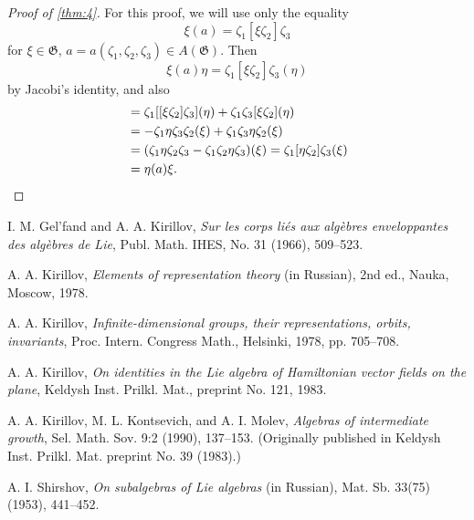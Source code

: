 \documentclass[a4paper]{article}
\begin{document}
\begin{proof}[Proof of \cref{thm:4}]
	For this proof, we will use only the equality
	\begin{equation*}
		\xi(a) = \zeta_1 [\xi \zeta_2] \zeta_3
	\end{equation*}
	for $\xi \in \mathfrak{G}$, $a = a(\zeta_1,\zeta_2,\zeta_3) \in A(\mathfrak{G})$.
	Then
	\begin{equation*}
		\xi(a) \eta = \zeta_1 [\xi \zeta_2] \zeta_3(\eta)
	\end{equation*}
	by Jacobi's identity, and also
	\begin{equation*}
		\begin{split}
			& = \zeta_1 [[\xi \zeta_2] \zeta_3](\eta) + \zeta_1 \zeta_3 [\xi \zeta_2](\eta) \\
			& = - \zeta_1 \eta \zeta_3 \zeta_2 (\xi) + \zeta_1 \zeta_3 \eta \zeta_2 (\xi) \\
			& = (\zeta_1 \eta \zeta_2 \zeta_3 - \zeta_1 \zeta_2 \eta \zeta_3) (\xi)
			= \zeta_1 [\eta \zeta_2] \zeta_3 (\xi) 
			\\
			& = \eta(a) \xi. \qedhere
		\end{split}
	\end{equation*}
\end{proof}



\begin{thebibliography}{99}
	
	I. M. Gel'fand and A. A. Kirillov, 
	\textit{Sur les corps li\'es aux alg\`ebres enveloppantes des alg\`ebres de Lie}, 
	Publ. Math. IHES, No. 31 (1966), 509--523.
	
	A. A. Kirillov, 
	\textit{Elements of representation theory} (in Russian), 2nd ed., Nauka, Moscow, 1978.
	
	A. A. Kirillov, 
	\textit{Infinite-dimensional groups, their representations, orbits, invariants}, 
	Proc. Intern. Congress Math., Helsinki, 1978, pp. 705--708.
	
	A. A. Kirillov, 
	\textit{On identities in the Lie algebra of Hamiltonian vector fields on the plane}, 
	Keldysh Inst. Prilkl. Mat., preprint No. 121, 1983.
	
	A. A. Kirillov, M. L. Kontsevich, and A. I. Molev, 
	\textit{Algebras of intermediate growth}, 
	Sel. Math. Sov. 9:2 (1990), 137--153. (Originally published in Keldysh Inst. Prilkl. Mat. preprint No. 39 (1983).)
	
	A. I. Shirshov, 
	\textit{On subalgebras of Lie algebras} (in Russian), 
	Mat. Sb. 33(75) (1953), 441--452.
	
\end{thebibliography}

	
	
\end{document}
